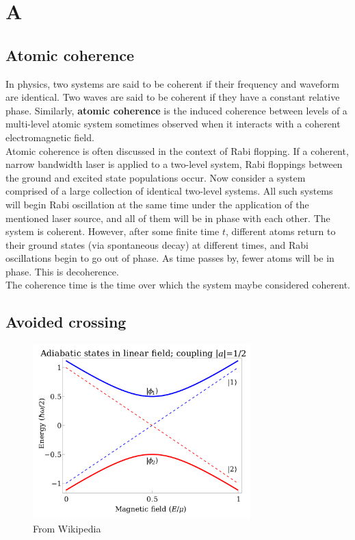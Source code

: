 \documentclass{book}
\theoremstyle{definition}
\begin{document}
\chapter*{A}



\section*{Atomic coherence}

In physics, two systems are said to be coherent if their frequency and waveform are identical. Two waves are said to be coherent if they have a constant relative phase. Similarly, \textbf{atomic coherence} is the induced coherence between levels of a multi-level atomic system sometimes observed when it interacts with a coherent electromagnetic field.\\


Atomic coherence is often discussed in the context of Rabi flopping. If a coherent, narrow bandwidth laser is applied to a two-level system, Rabi floppings between the ground and excited state populations occur. Now consider a system comprised of a large collection of identical two-level systems. All such systems will begin Rabi oscillation at the same time under the application of the mentioned laser source, and all of them will be in phase with each other. The system is coherent. However, after some finite time $t$, different atoms return to their ground states (via spontaneous decay) at different times, and Rabi oscillations begin to go out of phase. As time passes by, fewer atoms will be in phase. This is decoherence. \\

The coherence time is the time over which the system maybe considered coherent. 

\section*{Avoided crossing}


\begin{figure}[!htb]
	\centering
	\includegraphics*[width=0.75\textwidth]{images/avoided_crossing}
	\caption{From Wikipedia}
\end{figure}
\end{document}
